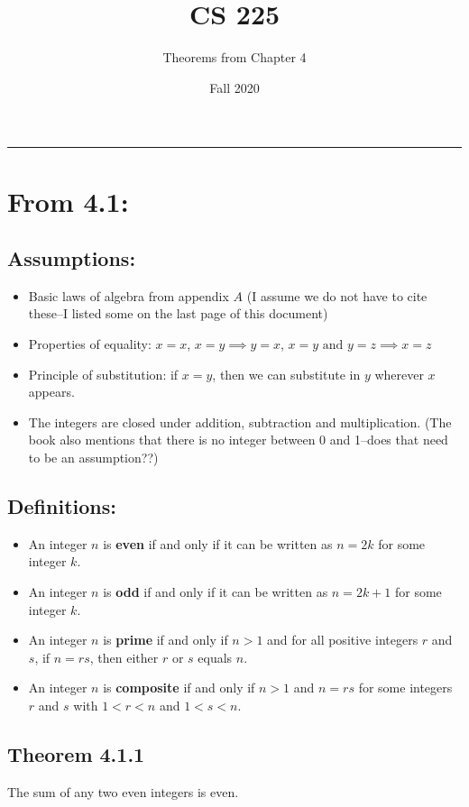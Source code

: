 \documentclass[11pt]{article}
\title{CS 225}
\author{Theorems from Chapter 4}
\date{Fall 2020}
\begin{document}
\maketitle
\hrule

\section*{From 4.1:}
\subsection*{Assumptions:}
\begin{itemize}
    \item Basic laws of algebra from appendix $A$ (I assume we do not have to cite these--I listed some on
    the last page of this document)
    \item Properties of equality: $x = x$, $x = y \implies y = x$, $x = y \text{ and } y = z \implies x = z$
    \item Principle of substitution: if $x = y$, then we can substitute in $y$ wherever $x$ appears. 
    \item The integers are closed under addition, subtraction and multiplication. (The book also 
    mentions that there is no integer between 0 and 1--does that need to be an assumption??)
\end{itemize}

\subsection*{Definitions:}
\begin{itemize}
    \item An integer $n$ is {\bf even} if and only if 
    it can be written as $n = 2k$ for some integer $k$. 
    \item An integer $n$ is {\bf odd} if and only if 
    it can be written as $n = 2k + 1$ for some integer $k$. 
    \item An integer $n$ is {\bf prime} if and only if 
    $n > 1$ and for all positive integers $r$ and $s$, if 
    $n = rs$, then either $r$ or $s$ equals $n$. 
    \item An integer $n$ is {\bf composite} if and only if
    $n > 1$ and $n = rs$ for some integers $r$ and $s$ with
    $1< r< n$ and $1< s< n$. 
\end{itemize}

\subsection*{Theorem 4.1.1}
The sum of any two even integers is even. 
\end{document}
